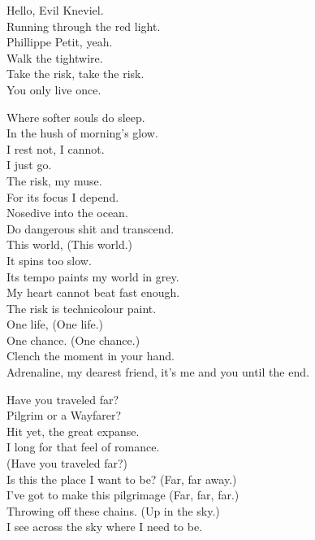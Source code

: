 
Hello, Evil Kneviel. \\
Running through the red light. \\
Phillippe Petit, yeah. \\
Walk the tightwire. \\
Take the risk, take the risk. \\
You only live once. \\


Where softer souls do sleep. \\
In the hush of morning's glow. \\
I rest not, I cannot. \\
I just go. \\
The risk, my muse. \\
For its focus I depend. \\
Nosedive into the ocean. \\
Do dangerous shit and transcend. \\
This world, (This world.) \\
It spins too slow. \\
Its tempo paints my world in grey. \\
My heart cannot beat fast enough. \\
The risk is technicolour paint. \\
One life, (One life.) \\
One chance. (One chance.) \\
Clench the moment in your hand. \\
Adrenaline, my dearest friend, it's me and you until the end. \\



Have you traveled far? \\
Pilgrim or a Wayfarer? \\
Hit yet, the great expanse. \\
I long for that feel of romance. \\

(Have you traveled far?) \\
Is this the place I want to be? (Far, far away.) \\
I've got to make this pilgrimage (Far, far, far.) \\
Throwing off these chains. (Up in the sky.) \\
I see across the sky where I need to be. \\

